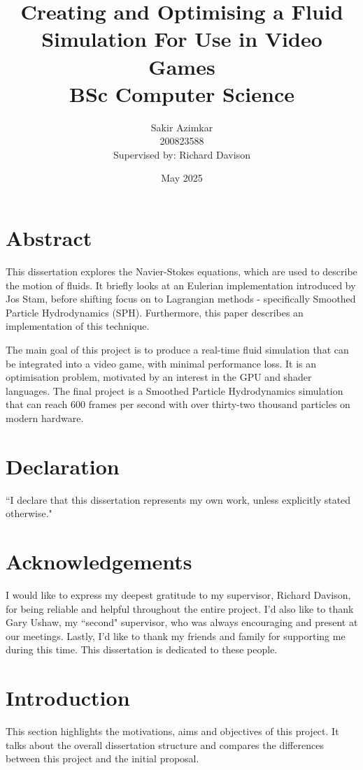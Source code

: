\documentclass[a4paper, 12pt]{article}
\title
{
    {\Huge Creating and Optimising a Fluid Simulation For Use in Video Games} \\
    \vspace*{1cm}
    {\LARGE BSc Computer Science}
}
\author
{
    \vspace*{0.1cm}\huge Sakir Azimkar \\
    \vspace*{1cm}\huge 200823588 \\
    \large Supervised by: Richard Davison
}
\date{May 2025}
\begin{document}
    \maketitle
    \thispagestyle{empty}

    \newpage

    \section*{Abstract}
    This dissertation explores the Navier-Stokes equations, which are used to describe the motion of fluids. It briefly looks at an Eulerian implementation introduced by Jos Stam\cite{stam}, before shifting focus on to Lagrangian methods - specifically Smoothed Particle Hydrodynamics (SPH). Furthermore, this paper describes an implementation of this technique. 
    
    The main goal of this project is to produce a real-time fluid simulation that can be integrated into a video game, with minimal performance loss. It is an optimisation problem, motivated by an interest in the GPU and shader languages. The final project is a Smoothed Particle Hydrodynamics simulation that can reach 600 frames per second with over thirty-two thousand particles on modern hardware.
    
    \newpage

    \section*{Declaration} ``I declare that this dissertation represents my own work, unless explicitly stated otherwise."

    \newpage

    \section*{Acknowledgements}
    I would like to express my deepest gratitude to my supervisor, Richard Davison, for being reliable and helpful throughout the entire project. I'd also like to thank Gary Ushaw, my ``second" supervisor, who was always encouraging and present at our meetings. Lastly, I'd like to thank my friends and family for supporting me during this time. This dissertation is dedicated to these people.
    
    \newpage
    \tableofcontents
    \newpage
    \listoffigures
    \newpage

    \section{Introduction}
    \label{sec:introduction}
    This section highlights the motivations, aims and objectives of this project. It talks about the overall dissertation structure and compares the differences between this project and the initial proposal.
    
\end{document}
